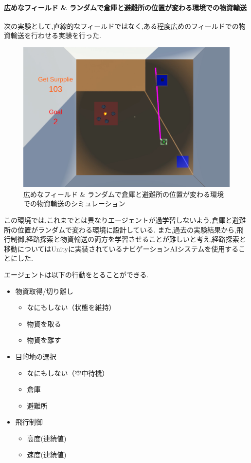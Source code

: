 \documentclass{article}[jsarticle]
\begin{document}
\paragraph{広めなフィールド \& ランダムで倉庫と避難所の位置が変わる環境での物資輸送}
次の実験として,直線的なフィールドではなく,ある程度広めのフィールドでの物資輸送を行わせる実験を行った.
\begin{figure}[H]
    \centering
    \includegraphics[width=\textwidth]{./Images/20240203221239.png}
    \captionsetup{justification=centering}
    \caption{広めなフィールド \& ランダムで倉庫と避難所の位置が変わる環境での物資輸送のシミュレーション}
\end{figure}
この環境では,これまでとは異なりエージェントが過学習しないよう,倉庫と避難所の位置がランダムで変わる環境に設計している.
また,過去の実験結果から,飛行制御,経路探索と物資輸送の両方を学習させることが難しいと考え,経路探索と移動についてはUnityに実装されているナビゲーションAIシステムを使用することにした.\par 
エージェントは以下の行動をとることができる.
\begin{itemize}
    \item 物資取得/切り離し
    \begin{itemize}
        \item なにもしない（状態を維持）
        \item 物資を取る
        \item 物資を離す
    \end{itemize}
    \item 目的地の選択
    \begin{itemize}
        \item なにもしない（空中待機）
        \item 倉庫
        \item 避難所
    \end{itemize}
    \item 飛行制御
    \begin{itemize}
        \item 高度(連続値)
        \item 速度(連続値)
    \end{itemize}
\end{itemize}
\end{document}
